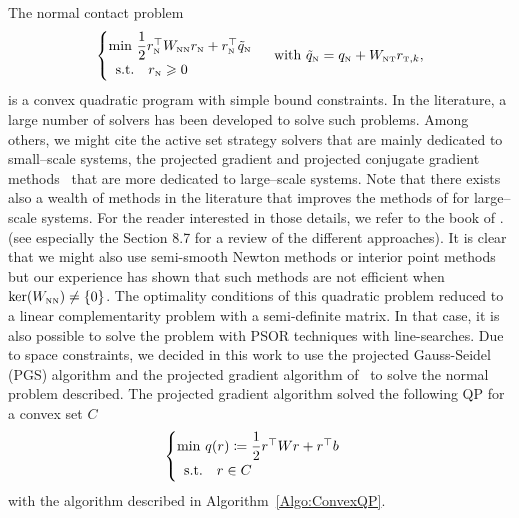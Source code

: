 The normal contact problem
 \begin{equation}
  \label{eq:AO-3-bis}
  \begin{cases}
    \min\, \Frac 1 2 r_\n^\top  W_{\n\n} r_\n + r_\n^\top \tilde q_\n \\
    \begin{array}{ll}
    \text{s.t.} & r_\n \geq 0
  \end{array}\end{cases} \text{ with }   \tilde q_\n =  q_\n + W_{\n\t}r_{\t,k},
\end{equation}
is a convex quadratic program with simple bound constraints.
%
In the literature, a large number of solvers has been developed to solve such problems. Among others, we might cite the active set strategy solvers \cite{Fletcher1987,Nocedal.Wright1999} that are mainly dedicated to  small--scale systems, the projected gradient \cite{Calamai.More1987} and projected conjugate gradient methods~\citep{More.Toraldo_NM1989,More.Toraldo1991} that are more dedicated to large--scale systems. Note that there exists also a wealth of methods in the literature that improves the methods of \cite{More.Toraldo1991} for large--scale systems. For the reader interested in those details, we refer to the book of \cite{Dostal.ea_AMM2016}. (see especially the Section 8.7 for a review of the different approaches).
%
It is clear that we might also use semi-smooth Newton methods or interior point methods but our experience has shown that such methods are not efficient when $\ker (W_{{\hbox{\tiny{N}}}{\hbox{\tiny{N}}}}) \neq \{0\}$. The optimality conditions of this quadratic problem  reduced to a linear complementarity problem with a semi-definite matrix. In that case, it is also possible to solve the problem with PSOR techniques with line-searches.
%
Due to space constraints, we decided in this work to use the projected Gauss-Seidel (PGS) algorithm and the projected gradient algorithm of~\cite{Calamai.More1987} to solve the normal problem described. The projected gradient algorithm solved
the following QP for a convex set $C$
 \begin{equation}
  \label{eq:ConvexQP}
  \begin{cases}
    \min\, q(r) \coloneqq \Frac 1 2 r^\top  W r + r ^\top  b \\
    \begin{array}{ll}
    \text{s.t.} & r \in C
  \end{array}\end{cases}
\end{equation}
with the algorithm described in  Algorithm~\ref{Algo:ConvexQP}.

